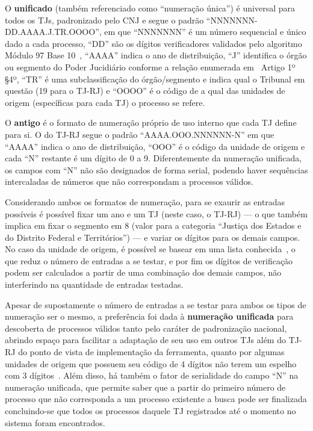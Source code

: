 O \textbf{unificado} (também referenciado como ``numeração única'') é universal
para todos os TJs, padronizado pelo CNJ
\cite{spec:cnj-numeração-única,spec:cnj-numeração-única-resolução} e segue o
padrão ``NNNNNNN-DD.AAAA.J.TR.OOOO'', em que ``NNNNNNN'' é um número sequencial
e único dado a cada processo, ``DD'' são os dígitos verificadores validados
pelo algoritmo Módulo 97 Base 10~\cite{spec:iso-modulo-97}, ``AAAA'' indica o
ano de distribuição, ``J'' identifica o órgão ou segmento do Poder Jucidiário
conforme a relação enumerada em~\cite{spec:cnj-numeração-única-resolução}
Artigo 1º \S 4º, ``TR'' é uma subclassificação do órgão/segmento e indica qual
o Tribunal em questão (19 para o TJ-RJ) e ``OOOO'' é o código de a qual das
unidades de origem (específicas para cada TJ) o processo se refere.

O \textbf{antigo} é o formato de numeração próprio de uso interno que cada TJ
define para si. O do TJ-RJ segue o padrão ``AAAA.OOO.NNNNNN-N'' em que ``AAAA''
indica o ano de distribuição, ``OOO'' é o código da unidade de origem e cada
``N'' restante é um dígito de 0 a 9. Diferentemente da numeração unificada, os
campos com ``N'' não são designados de forma serial, podendo haver sequências
intercaladas de números que não correspondam a processos válidos.

Considerando ambos os formatos de numeração, para se exaurir as entradas
possíveis é possível fixar um ano e um TJ (neste caso, o TJ-RJ) --- o que
também implica em fixar o segmento em 8 (valor para a categoria ``Justiça dos
Estados e do Distrito Federal e Territórios'') --- e variar os dígitos para os
demais campos. No caso da unidade de origem, é possível se basear em uma lista
conhecida~\cite{spec:tjrj-codigos-unidades-de-origem}, o que reduz o número de
entradas a se testar, e por fim os dígitos de verificação podem ser calculados
a partir de uma combinação dos demais campos, não interferindo na quantidade de
entradas testadas.

Apesar de supostamente o número de entradas a se testar para ambos os tipos de
numeração ser o mesmo, a preferência foi dada à \textbf{numeração unificada}
para descoberta de processos válidos tanto pelo caráter de padronização
nacional, abrindo espaço para facilitar a adaptação de seu uso em outros TJs
além do TJ-RJ do ponto de vista de implementação da ferramenta, quanto por
algumas unidades de origem que possuem seu código de 4 dígitos não terem um
espelho com 3 dígitos~\cite{spec:tjrj-codigos-unidades-de-origem}. Além disso,
há também o fator de serialidade do campo ``N'' na numeração unificada, que
permite saber que a partir do primeiro número de processo que não corresponda a
um processo existente a busca pode ser finalizada concluindo-se que todos os
processos daquele TJ registrados até o momento no sistema foram encontrados.

